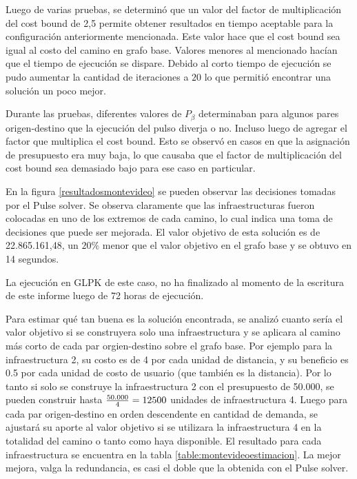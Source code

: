 \documentclass{article}
\begin{document}
  Luego de varias pruebas, se determinó que un valor del factor de multiplicación del cost bound de 2,5 permite obtener resultados en tiempo aceptable para la configuración anteriormente mencionada. Este valor hace que el cost bound sea igual al costo del camino en grafo base. Valores menores al mencionado hacían que el tiempo de ejecución se dispare. Debido al corto tiempo de ejecución se pudo aumentar la cantidad de iteraciones a $20$ lo que permitió encontrar una solución un poco mejor.
  
  Durante las pruebas, diferentes valores de $P_{\beta}$ determinaban para algunos pares origen-destino que la ejecución del pulso diverja o no. Incluso luego de agregar el factor que multiplica el cost bound. Esto se observó en casos en que la asignación de presupuesto era muy baja, lo que causaba que el factor de multiplicación del cost bound sea demasiado bajo para ese caso en particular.
  
  En la figura \ref{resultadosmontevideo} se pueden observar las decisiones tomadas por el Pulse solver. Se observa claramente que las infraestructuras fueron colocadas en uno de los extremos de cada camino, lo cual indica una toma de decisiones que puede ser mejorada. El valor objetivo de esta solución es de 22.865.161,48, un $20\%$ menor que el valor objetivo en el grafo base y se obtuvo en 14 segundos.

  La ejecución en GLPK de este caso, no ha finalizado al momento de la escritura de este informe luego de 72 horas de ejecución.

  Para estimar qué tan buena es la solución encontrada, se analizó cuanto sería el valor objetivo si se construyera solo una infraestructura y se aplicara al camino más corto de cada par orgien-destino sobre el grafo base. Por ejemplo para la infraestructura 2, su costo es de 4 por cada unidad de distancia, y su beneficio es 0.5 por cada unidad de costo de usuario (que también es la distancia). Por lo tanto si solo se construye la infraestructura 2 con el presupuesto de 50.000, se pueden construir hasta ${50.000 \over 4} = 12500$ unidades de infraestructura 4. Luego para cada par origen-destino en orden descendente en cantidad de demanda, se ajustará su aporte al valor objetivo si se utilizara la infraestructura 4 en la totalidad del camino o tanto como haya disponible. El resultado para cada infraestructura se encuentra en la tabla \ref{table:montevideoestimacion}. La mejor mejora, valga la redundancia, es casi el doble que la obtenida con el Pulse solver.
  
\end{document}
